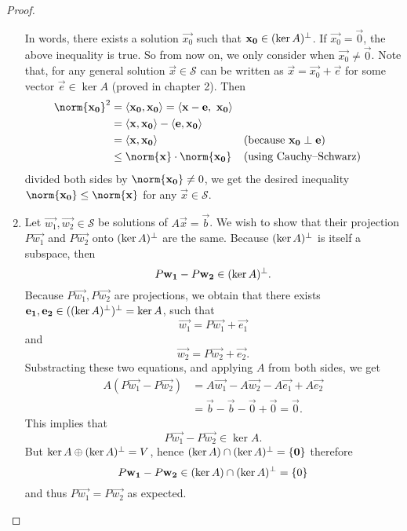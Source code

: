 \documentclass{article}
\begin{document}
\begin{proof}
\begin{enumerate}[label={(\alph*)}]
      \hspace{1em}
      In words, there exists a solution $\vec{x_0}$ such that 
      $\mathbf{x_0}\in(\ker A)^\perp$. If $\vec{x_0}=\vec{0}$, 
      the above inequality is true. So from now on, we only 
      consider when $\vec{x_0}\neq \vec{0}$.
      Note that, for any general solution $\vec{x}\in\mathcal S$ 
      can be written as $\vec{x}=\vec{x_0}+\vec{e}$ for some vector 
      $\vec{e}\in\ker A$ (proved in chapter 2). Then
      \begin{align*}
        \norm{\vec{x_0}}^2
        &=\ang{\vec{x_0},\vec{x_0}}
        =\ang{\vec{x}-\vec{e},~ \vec{x_0}}\\
        &=\ang{\vec{x},\vec{x_0}}-\ang{\vec{e},\vec{x_0}}\\
        &=\ang{\vec{x},\vec{x_0}}
        &&\text{(because $\vec{x_0}\perp\vec{e}$)}\\
        &\leq \norm{\vec{x}}\cdot\norm{\vec{x_0}}
        &&\text{(using Cauchy--Schwarz)}
      \end{align*}
      divided both sides by $\norm{\vec{x_0}}\neq 0$, we get the desired 
      inequality $\norm{\vec{x_0}}\leq\norm{\vec{x}}$ for any 
      $\vec{x}\in\mathcal S$.
    \item Let $\vec{w_1}, \vec{w_2}\in\mathcal S$ be solutions of 
      $A\vec{x}=\vec{b}$. We wish to show that their projection 
      $P\vec{w_1}$ and $P\vec{w_2}$ onto $(\ker A)^\perp$ are the same.
      Because $(\ker A)^\perp$ is itself a subspace, then 
      \begin{equation}
        P\mathbf{w_1}-P\mathbf{w_2}\in(\ker A)^\perp.
      \end{equation}
      Because $P\vec{w_1},P\vec{w_2}$ are projections, we obtain that 
      there exists $\mathbf{e_1},\mathbf{e_2}\in((\ker A)^\perp)^\perp=\ker A$,
      such that
      \[ \vec{w_1}=P\vec{w_1}+\vec{e_1} \] and
      \[ \vec{w_2}=P\vec{w_2}+\vec{e_2}. \]
      Substracting these two equations, and applying $A$ from both sides,
      we get
      \begin{align*}
        A(P\vec{w_1}-P\vec{w_2})
        &= A\vec{w_1}-A\vec{w_2}-A\vec{e_1}+A\vec{e_2}\\
        &= \vec{b}-\vec{b}-\vec{0}+\vec{0}=\vec{0}.
      \end{align*}
      This implies that 
      \begin{equation}
        P\vec{w_1}-P\vec{w_2}\in \ker A.
      \end{equation}
      But $\ker A \oplus(\ker A)^\perp=V$, hence 
      $(\ker A)\cap(\ker A)^\perp=\{\mathbf{0}\}$ therefore
      \[ P\mathbf{w_1}-P\mathbf{w_2}\in(\ker A)\cap(\ker A)^\perp=\{0\} \]
      and thus $P\vec{w_1}=P\vec{w_2}$ as expected.
  \end{enumerate}
\end{proof}
\end{document}
